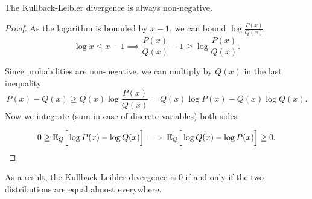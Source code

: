 \begin{proposition}
The Kullback-Leibler divergence is always non-negative.
\end{proposition}
\begin{proof}
  As the logarithm is bounded by \(x - 1\), we can bound \(\log{\frac{P(x)}{Q(x)}}\)
  \[
    \log{x} \leq x - 1 \implies \frac{P(x)}{Q(x)} - 1 \geq \log{\frac{P(x)}{Q(x)}}.
  \]

  Since probabilities are non-negative, we can multiply by \(Q(x)\) in the last inequality
  \[
    P(x) - Q(x) \geq Q(x) \log \frac{P(x)}{Q(x)} = Q(x) \log{P(x)} - Q(x) \log{Q(x)}.
  \]
  Now we integrate (sum in case of discrete variables) both sides

  \[
    0 \geq \mathbb{E}_{Q}\Big[\log{P(x)} - \log{Q(x)}\Big] \implies \mathbb{E}_{Q}\Big[\log{Q(x)}
    - \log{P(x)}\Big] \geq 0.
  \]
\end{proof}
As a result, the Kullback-Leibler divergence is \(0\) if and only if the two
distributions are equal almost everywhere.
